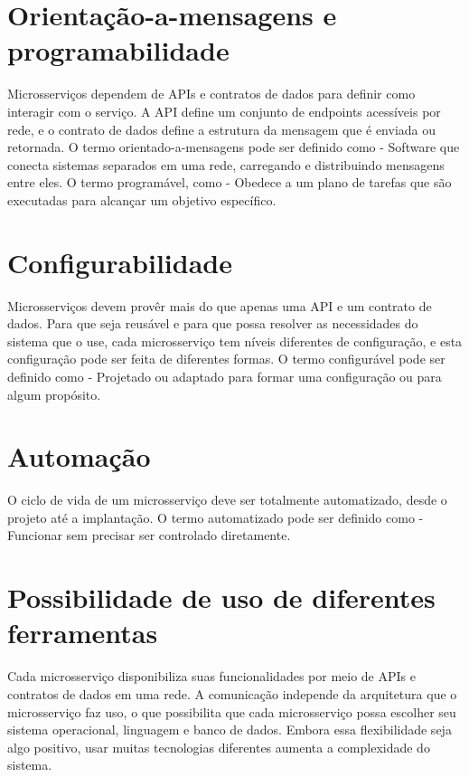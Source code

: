 \section{Orientação-a-mensagens e programabilidade}

Microsserviços dependem de APIs e contratos de dados para definir como interagir com o serviço. A API define um conjunto de endpoints acessíveis por rede, e o contrato de dados define a estrutura da mensagem que é enviada ou retornada. O termo orientado-a-mensagens pode ser definido como - Software que conecta sistemas separados em uma rede, carregando e distribuindo mensagens entre eles. O termo programável, como - Obedece a um plano de tarefas que são executadas para alcançar um objetivo específico. \cite{Familiar2015}

\section{Configurabilidade}

Microsserviços devem provêr mais do que apenas uma API e um contrato de dados. Para que seja reusável e para que possa resolver as necessidades do sistema que o use, cada microsserviço tem níveis diferentes de configuração, e esta configuração pode ser feita de diferentes formas. O termo configurável pode ser definido como - Projetado ou adaptado para formar uma configuração ou para algum propósito. \cite{Familiar2015}

\section {Automação}

O ciclo de vida de um microsserviço deve ser totalmente automatizado, desde o projeto até a implantação. O termo automatizado pode ser definido como - Funcionar sem precisar ser controlado diretamente. \cite{Familiar2015}


\section{Possibilidade de uso de diferentes ferramentas}

Cada microsserviço disponibiliza suas funcionalidades por meio de APIs e contratos de dados em uma rede. A comunicação independe da arquitetura que o microsserviço faz uso, o que possibilita que cada microsserviço possa escolher seu sistema operacional, linguagem e banco de dados. Embora essa flexibilidade seja algo positivo, usar muitas tecnologias diferentes aumenta a complexidade do sistema. \cite{Familiar2015}

